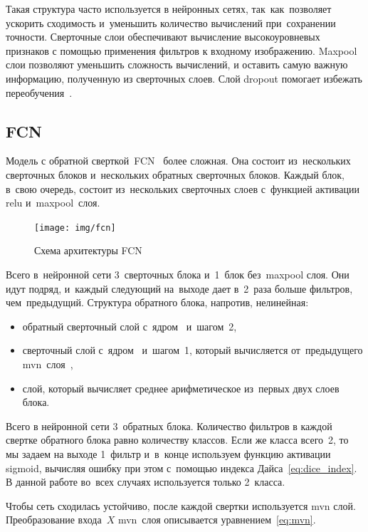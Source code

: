 Такая структура часто используется в нейронных сетях, так~как~позволяет ускорить сходимость и~уменьшить количество вычислений при~сохранении точности. Сверточные слои обеспечивают вычисление высокоуровневых признаков с помощью применения фильтров к входному изображению. Maxpool слои позволяют уменьшить сложность вычислений, и оставить самую важную информацию, полученную из сверточных слоев. Слой dropout помогает избежать переобучения~\cite{dropout}. 

\subsection{FCN}

Модель с обратной сверткой~FCN~\cite{fcn} более сложная. Она состоит из~нескольких сверточных блоков и~нескольких обратных сверточных блоков. Каждый блок, в~свою очередь, состоит из~нескольких сверточных слоев с~функцией активации relu и~maxpool~слоя. 

\begin{figure}[ht]
  \texttt{[image: img/fcn]}
  \caption{Схема архитектуры FCN}
\end{figure}

Всего в~нейронной сети 3~сверточных блока и~1~блок без~maxpool слоя. Они идут подряд, и~каждый следующий на~выходе дает в~2~раза больше фильтров, чем~предыдущий. 
Структура обратного блока, напротив, нелинейная:

\begin{itemize}
  \item обратный сверточный слой с~ядром~ и~шагом~2,
  \item сверточный слой с~ядром~ и~шагом~1, который вычисляется от~предыдущего mvn~слоя~\cite{batch_norm},
  \item слой, который вычисляет среднее арифметическое из~первых двух слоев блока.
\end{itemize}

Всего в нейронной сети 3~обратных блока. 
Количество фильтров в каждой свертке обратного блока 
равно количеству классов. Если же класса всего~2, 
то мы задаем на выходе 1~фильтр и~в~конце используем 
функцию активации sigmoid, вычисляя ошибку при этом 
с~помощью индекса Дайса~\eqref{eq:dice_index}. 
В данной работе во~всех случаях используется только 2~класса.

Чтобы сеть сходилась устойчиво, после каждой свертки 
используется mvn слой. Преобразование входа~$X$ mvn~слоя 
описывается уравнением~\eqref{eq:mvn}. 

